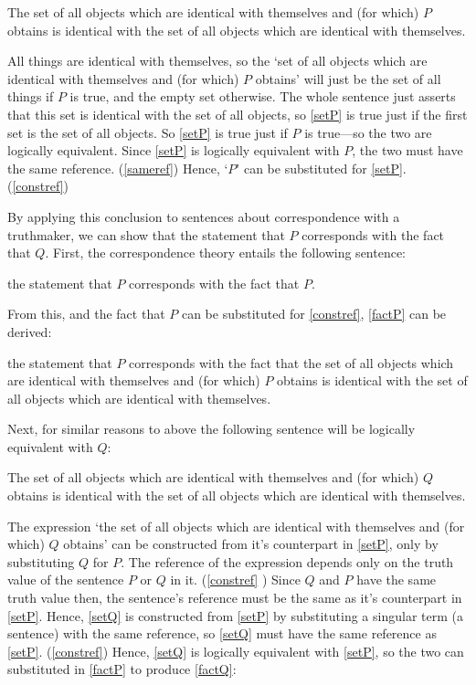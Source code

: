 	\begin{example} \label{setP}
	The set of all objects which are identical with themselves and (for which) $P$ obtains is identical with the set of all objects which are identical with themselves.
	\end{example}

All things are identical with themselves, so the `set of all objects which are identical with themselves and (for which) $P$ obtains' will just be the set of all things if $P$ is true, and the empty set otherwise.
The whole sentence just asserts that this set is identical with the set of all objects, so \ref{setP} is true just if the first set is the set of all objects.
So \ref{setP} is true just if $P$ is true---so the two are logically equivalent.
Since \ref{setP} is logically equivalent with $P$, the two must have the same reference.
(\ref{sameref})
Hence, `$P$' can be substituted for \ref{setP}. (\ref{constref})

By applying this conclusion to sentences about correspondence with a truthmaker, we can show that the statement that $P$ corresponds with the fact that $Q$.
First, the correspondence theory entails the following sentence:

	\begin{example} \label{stateP}
	the statement that $P$ corresponds with the fact that $P$.
	\end{example}

From this, and the fact that $P$ can be substituted for \ref{constref}, \ref{factP} can be derived:

	\begin{example} \label{factP}
	the statement that $P$ corresponds with the fact that the set of all objects which are identical with themselves and (for which) $P$ obtains is identical with the set of all objects which are identical with themselves.
	\end{example}

Next, for similar reasons to above the following sentence will be logically equivalent with $Q$:

	\begin{example} \label{setQ}
	The set of all objects which are identical with themselves and (for which) $Q$ obtains is identical with the set of all objects which are identical with themselves.
	\end{example}

The expression `the set of all objects which are identical with themselves and (for which) $Q$ obtains' can be constructed from it's counterpart in \ref{setP}, only by substituting $Q$ for $P$.
The reference of the expression depends only on the truth value of the sentence $P$ or $Q$ in it. (\ref{constref} )
Since $Q$ and $P$ have the same truth value then, the sentence's reference must be the same as it's counterpart in \ref{setP}.
Hence, \ref{setQ} is constructed from \ref{setP} by substituting a singular term (a sentence) with the same reference, so \ref{setQ} must have the same reference as \ref{setP}.
(\ref{constref})
Hence, \ref{setQ} is logically equivalent with \ref{setP}, so the two can substituted in \ref{factP} to produce \ref{factQ}:


